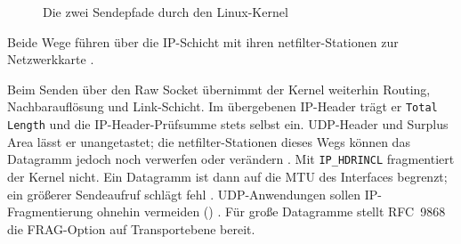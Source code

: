 \begin{figure}[H]
  \centering
  \caption[Die zwei Sendepfade durch den Linux-Kernel]{Die zwei Sendepfade durch den Linux-Kernel
    \cite{stephan2024packetpath,man7raw}}
  \label{fig:sendepfade}
\end{figure}

Beide Wege führen über die IP-Schicht mit ihren netfilter-Stationen zur Netzwerkkarte \cite{stephan2024packetpath}.

Beim Senden über den Raw Socket übernimmt der Kernel weiterhin Routing, Nachbarauflösung und Link-Schicht.
Im übergebenen IP-Header trägt er \texttt{Total Length}
und die IP-Header-Prüfsumme stets selbst ein. UDP-Header und Surplus Area lässt er unangetastet; die netfilter-Stationen
dieses Wegs können das Datagramm jedoch noch verwerfen oder verändern \cite{man7raw,stephan2024packetpath}. Mit
\texttt{IP\_HDRINCL} fragmentiert der Kernel nicht. Ein Datagramm ist dann auf die MTU des Interfaces begrenzt; ein
größerer Sendeaufruf schlägt fehl \cite{man7raw}. UDP-Anwendungen sollen IP-Fragmentierung ohnehin vermeiden
() \cite[Sec.~3.2]{rfc8085}. Für große Datagramme stellt RFC~9868 die FRAG-Option auf Transportebene
bereit.

